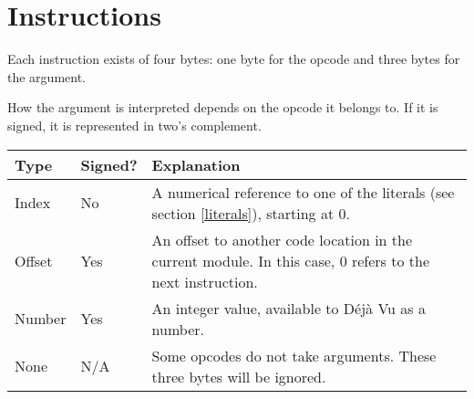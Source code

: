 \section{Instructions}

Each instruction exists of four bytes: one byte for the opcode and three bytes
for the argument.

How the argument is interpreted depends on the opcode it belongs to. If
it is signed, it is represented in two's complement.

\begin{tabular}{llp{7.6cm}}
\bfseries{Type} & \bfseries{Signed?} & \bfseries{Explanation} \\ \hline
Index & No & A numerical reference to one of the literals (see section \ref{literals}), starting at 0. \\
Offset & Yes & An offset to another code location in the current module. In this case, 0 refers to the next instruction. \\
Number & Yes & An integer value, available to Déjà Vu as a number. \\
None & N/A & Some opcodes do not take arguments. These three bytes will be ignored. \\
\end{tabular}


